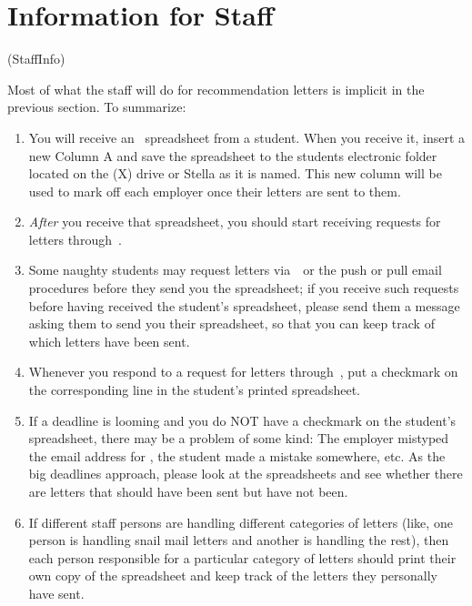 \documentclass{econtex}
\begin{document}
\begin{comment}
\end{quote}

\end{comment}

\section{Information for Staff}\ifdvi\hypertarget{StaffInfo}{(StaffInfo)}\fi

Most of what the staff will do for recommendation letters is implicit in the previous section.  To
summarize:
\begin{enumerate}
\item You will receive an \EM~spreadsheet from a student.  When you receive it, insert a new Column A and save the spreadsheet to the students electronic folder located on the (X) drive or Stella as it is named. This new column will be used to mark off each employer once their letters are sent to them.
\item {\it After} you receive that spreadsheet, you should start receiving requests for letters through~\JMStaffEmail.  
\item Some naughty students may request letters via~\EJM~or the push or pull email procedures before they send you the spreadsheet; if you receive such requests before having received the student's spreadsheet, please send them a message asking them to send you their spreadsheet, so that you can keep track of which letters have been sent.
\item Whenever you respond to a request for letters through~\JMStaffEmail, put a checkmark on the corresponding line in the student's printed spreadsheet.
\item If a deadline is looming and you do NOT have a checkmark on the student's spreadsheet, there may be a problem of some kind: The employer mistyped the email address for \JMStaffEmail, the student made a mistake somewhere, etc.  As the big deadlines approach, please look at the spreadsheets and see whether there are letters that should have been sent but have not been.
\item If different staff persons are handling different categories of letters (like, one person is handling snail mail letters and another is handling the rest), then each person responsible for a particular category of letters should print their own copy of the spreadsheet and keep track of the letters they personally have sent.
\end{enumerate}
\end{document}
